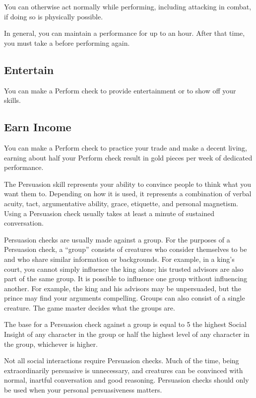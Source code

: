         You can otherwise act normally while performing, including attacking in combat, if doing so is physically possible.

        In general, you can maintain a performance for up to an hour.
        After that time, you must take a  before performing again.

    \subsection{Entertain}
        You can make a Perform check to provide entertainment or to show off your skills.

    \subsection{Earn Income}
        You can make a Perform check to practice your trade and make a decent living, earning about half your Perform check result in gold pieces per week of dedicated performance.

\newpage
{}
        The Persuasion skill represents your ability to convince people to think what you want them to.
        Depending on how it is used, it represents a combination of verbal acuity, tact, argumentative ability, grace, etiquette, and personal magnetism.
        Using a Persuasion check usually takes at least a minute of sustained conversation.

        Persuasion checks are usually made against a group. For the purposes of a Persuasion check, a ``group'' consists of creatures who consider themselves to be  and who share similar information or backgrounds. For example, in a king's court, you cannot simply influence the king alone; his trusted advisors are also part of the same group. It is possible to influence one group without influencing another. For example, the king and his advisors may be unpersuaded, but the prince may find your arguments compelling. Groups can also consist of a single creature. The game master decides what the groups are.

        The base  for a Persuasion check against a group is equal to 5 \add the highest Social Insight of any character in the group or half the highest level of any character in the group, whichever is higher.

        Not all social interactions require Persuasion checks. Much of the time, being extraordinarily persuasive is unnecessary, and creatures can be convinced with normal, inartful conversation and good reasoning. Persuasion checks should only be used when your personal persuasiveness matters.


